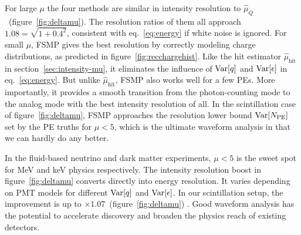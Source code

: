 For large $\mu$ the four methods are similar in intensity resolution to $\hat{\mu}_Q$~(figure~\ref{fig:deltamu}).  The resolution ratios of them all approach $1.08 = \sqrt{1 + 0.4^2}$, consistent with eq.~\eqref{eq:energy} if white noise is ignored.  For small $\mu$, FSMP gives the best resolution by correctly modeling charge distributions, as predicted in figure~\ref{fig:recchargehist}.  Like the hit estimator $\hat{\mu}_\mathrm{hit}$ in section~\ref{sec:intensity-mu}, it eliminates the influence of $\operatorname{Var}[q]$ and $\operatorname{Var}[\epsilon]$ in eq.~\eqref{eq:energy}.  But unlike $\hat{\mu}_\mathrm{hit}$, FSMP also works well for a few PEs.  More importantly, it provides a smooth transition from the photon-counting mode to the analog mode with the best intensity resolution of all.   In the scintillation case of figure~\ref{fig:deltamu}, FSMP approaches the resolution lower bound $\operatorname{Var}[N_\mathrm{PE}]$ set by the PE truths for $\mu < 5$, which is the ultimate waveform analysis in that we can hardly do any better.

In the fluid-based neutrino and dark matter experiments, $\mu < 5$ is the sweet spot for \si{MeV} and \si{keV} physics respectively.  The intensity resolution boost in figure~\ref{fig:deltamu} converts directly into energy resolution.  It varies depending on PMT models for different $\operatorname{Var}[q]$ and $\operatorname{Var}[\epsilon]$.  In our scintillation setup, the improvement is up to $\times 1.07$~(figure~\ref{fig:deltamu}) . Good waveform analysis has the potential to accelerate discovery and broaden the physics reach of existing detectors. 